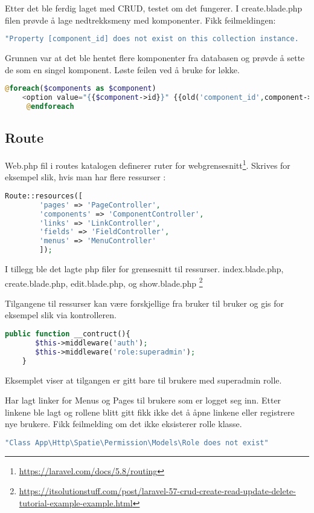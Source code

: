Etter det ble ferdig laget med CRUD, testet om det fungerer.
I create.blade.php filen prøvde å lage nedtrekksmeny med komponenter.
Fikk feilmeldingen:
\begin{lstlisting}[language=PHP]
    "Property [component_id] does not exist on this collection instance.
\end{lstlisting}

Grunnen var at det ble hentet flere komponenter fra databasen og prøvde å sette de som en singel komponent.
Løste feilen ved å bruke for løkke.
\begin{lstlisting}[language=PHP]
    @foreach($components as $component)
    <option value="{{$component->id}}" {{old('component_id',component->id)}}? selected> {{$component->name}} </option>
     @endforeach
\end{lstlisting} 

\subsection{Route}
Web.php fil i routes katalogen definerer  ruter  for webgrensesnitt\footnote{\url{https://laravel.com/docs/5.8/routing}}.
Skrives for eksempel slik, hvis man har flere ressurser :
\begin{lstlisting}[language=PHP]
    Route::resources([
        'pages' => 'PageController',
        'components' => 'ComponentController',
        'links' => 'LinkController',
        'fields' => 'FieldController',
        'menus' => 'MenuController'
        ]);
\end{lstlisting}

I tillegg ble det lagte php filer for grensesnitt til ressurser. index.blade.php, create.blade.php, edit.blade.php, og show.blade.php
\footnote{\url{https://itsolutionstuff.com/post/laravel-57-crud-create-read-update-delete-tutorial-example-example.html}}

Tilgangene til ressurser kan være forskjellige fra bruker til bruker og gis for eksempel slik via kontrolleren.
\begin{lstlisting}[language=PHP]
    public function __contruct(){
       $this->middleware('auth');
       $this->middleware('role:superadmin');
    }
\end{lstlisting}

Eksemplet viser at tilgangen er gitt bare til brukere med superadmin rolle.

Har lagt linker for Menus og Pages til brukere som er logget seg inn.
Etter linkene ble lagt og rollene blitt gitt fikk ikke det å åpne linkene eller registrere nye brukere. Fikk feilmelding om det ikke eksisterer rolle klasse. 
\begin{lstlisting}[language=PHP]
    "Class App\Http\Spatie\Permission\Models\Role does not exist"
\end{lstlisting}
 
